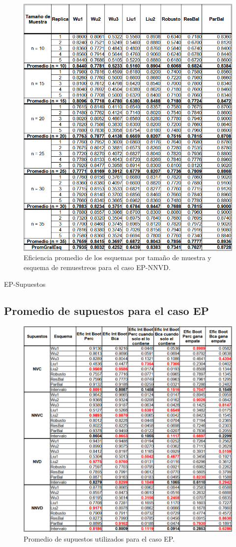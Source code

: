 \begin{figure}[ht] 
	\centering 
	\includegraphics[width=0.9\linewidth]{img/EP_NNVD_Efic_Esq.png} 
	\caption{Eficiencia promedio de los esquemas por tamaño de muestra y esquema de remuestreos para el caso EP-NNVD.} 
	\label{fig:EP_NNVD_Esq}
\end{figure}

EP-Supuestos
\subsection{Promedio de supuestos para el caso EP}

\begin{figure}[ht] 
	\centering 
	\includegraphics[width=0.9\linewidth]{img/EP_Prom_Supuestos.png} 
	\caption{Promedio de supuestos utilizados para el caso EP.} 
	\label{fig:EP_Supuestos}
\end{figure}

